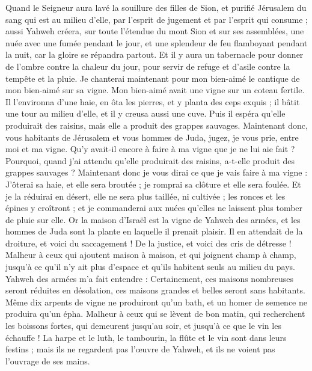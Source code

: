 \begin{multicols}{2}
Quand le Seigneur aura lavé la souillure des filles de Sion, et purifié Jérusalem du sang qui est au milieu d'elle, par l'esprit de jugement et par l'esprit qui consume ;
aussi Yahweh créera, sur toute l'étendue du mont Sion et sur ses assemblées, une nuée avec une fumée pendant le jour, et une splendeur de feu flamboyant pendant la nuit, car la gloire se répandra partout.
Et il y aura un tabernacle pour donner de l'ombre contre la chaleur du jour, pour servir de refuge et d'asile contre la tempête et la pluie.
\VerseOne{}Je chanterai maintenant pour mon bien-aimé le cantique de mon bien-aimé sur sa vigne. Mon bien-aimé avait une vigne sur un coteau fertile.
Il l'environna d'une haie, en ôta les pierres, et y planta des ceps exquis ; il bâtit une tour au milieu d'elle, et il y creusa aussi une cuve. Puis il espéra qu'elle produirait des raisins, mais elle a produit des grappes sauvages.
Maintenant donc, vous habitants de Jérusalem et vous hommes de Juda, jugez, je vous prie, entre moi et ma vigne.
Qu'y avait-il encore à faire à ma vigne que je ne lui aie fait ? Pourquoi, quand j'ai attendu qu'elle produirait des raisins, a-t-elle produit des grappes sauvages ?
Maintenant donc je vous dirai ce que je vais faire à ma vigne : J'ôterai sa haie, et elle sera broutée ; je romprai sa clôture et elle sera foulée.
Et je la réduirai en désert, elle ne sera plus taillée, ni cultivée ; les ronces et les épines y croîtront ; et je commanderai aux nuées qu'elles ne laissent plus tomber de pluie sur elle.
Or la maison d'Israël est la vigne de Yahweh des armées, et les hommes de Juda sont la plante en laquelle il prenait plaisir. Il en attendait de la droiture, et voici du saccagement ! De la justice, et voici des cris de détresse !
Malheur à ceux qui ajoutent maison à maison, et qui joignent champ à champ, jusqu'à ce qu'il n'y ait plus d'espace et qu'ils habitent seuls au milieu du pays.
Yahweh des armées m'a fait entendre : Certainement, ces maisons nombreuses seront réduites en désolation, ces maisons grandes et belles seront sans habitants.
Même dix arpents de vigne ne produiront qu'un bath, et un homer de semence ne produira qu'un épha.
Malheur à ceux qui se lèvent de bon matin, qui recherchent les boissons fortes, qui demeurent jusqu'au soir, et jusqu'à ce que le vin les échauffe !
La harpe et le luth, le tambourin, la flûte et le vin sont dans leurs festins ; mais ils ne regardent pas l'œuvre de Yahweh, et ils ne voient pas l'ouvrage de ses mains.

\end{multicols}
